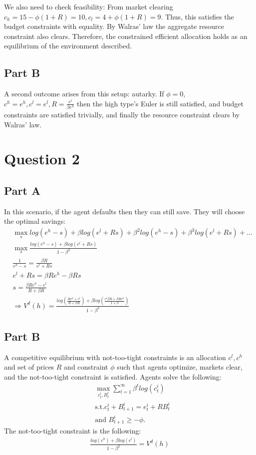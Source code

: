 \documentclass[11pt]{article} %
\begin{document}
We also need to check feasibility: From market clearing $c_h = 15-\phi(1+R) = 10,c_l = 4 + \phi(1+R) = 9.$ Thus, this satisfies the budget constraints with equality. By Walras' law the aggregate resource constraint also clears. Therefore, the constrained efficient allocation holds as an equilibrium of the environment described.

\subsection{Part B}
A second outcome arises from this setup: autarky. If $\phi = 0$, $c^h = e^h,c^l = e^l,R = \frac{e^l}{\beta e^h}$ then the high type's Euler is still satisfied, and budget constraints are satisfied trivially, and finally the resource constraint clears by Walras' law.

\section{Question 2}
\subsection{Part A}
In this scenario, if the agent defaults then they can still save. They will choose the optimal savings:
\begin{align*}
&\max_s  log(e^h - s) + \beta log(e^l + Rs) + \beta^2log(e^h - s) + \beta^3log(e^l + Rs) + \dots\\
&\max_s \frac{log(e^h - s) + \beta log(e^l + Rs)}{1-\beta^2}\\
&\frac{1}{e^h - s} =\frac{\beta R}{e^l + Rs}\\
&e^l + Rs = \beta R e^h - \beta R s\\
& s =\frac{\beta R e^h - e^l}{R+\beta R} \\
&\Rightarrow V^d(h) = \frac{log\left(\frac{Re^h + e^l}{R+\beta R}\right) + \beta log\left( \frac{e^l \beta R + \beta R e^h }{1+\beta }\right)}{1-\beta^2}
\end{align*}
\subsection{Part B}
A competitive equilibrium with not-too-tight constraints is an allocation $c^l,c^h $ and set of prices $R$ and constraint $\phi$ such that agents optimize, markets clear, and the not-too-tight constraint is satisfied. Agents solve the following:
\begin{align*}
&\max_{c^i_t,B^i_t} \sum_{t=1}^{\infty} \beta^t log(c_t^i)\\
&\text{s.t.} c_t^i + B^i_{t+1} = e_t^i + RB^i_t\\
&\text{and } B^{i}_{t+1} \geq -\phi.
\end{align*}
The not-too-tight constraint is the following:
\begin{align*}
\frac{log(c^h)+\beta log(c^l)}{1-\beta^2} = V^d(h) 
\end{align*}
\end{document}
